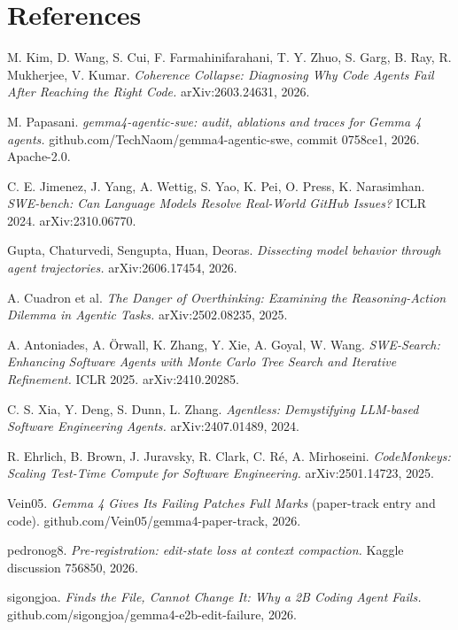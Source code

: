 \documentclass[10pt]{article}
\begin{document}
\section*{References}\small
\noindent [1] M. Kim, D. Wang, S. Cui, F. Farmahinifarahani, T. Y. Zhuo, S. Garg, B. Ray, R. Mukherjee, V. Kumar. \emph{Coherence Collapse: Diagnosing Why Code Agents Fail After Reaching the Right Code.} arXiv:2603.24631, 2026.\par\smallskip
\noindent [2] M. Papasani. \emph{gemma4-agentic-swe: audit, ablations and traces for Gemma 4 agents.} github.com/TechNaom/gemma4-agentic-swe, commit 0758ce1, 2026. Apache-2.0.\par\smallskip
\noindent [3] C. E. Jimenez, J. Yang, A. Wettig, S. Yao, K. Pei, O. Press, K. Narasimhan. \emph{SWE-bench: Can Language Models Resolve Real-World GitHub Issues?} ICLR 2024. arXiv:2310.06770.\par\smallskip
\noindent [4] Gupta, Chaturvedi, Sengupta, Huan, Deoras. \emph{Dissecting model behavior through agent trajectories.} arXiv:2606.17454, 2026.\par\smallskip
\noindent [5] A. Cuadron et al. \emph{The Danger of Overthinking: Examining the Reasoning-Action Dilemma in Agentic Tasks.} arXiv:2502.08235, 2025.\par\smallskip
\noindent [6] A. Antoniades, A. Örwall, K. Zhang, Y. Xie, A. Goyal, W. Wang. \emph{SWE-Search: Enhancing Software Agents with Monte Carlo Tree Search and Iterative Refinement.} ICLR 2025. arXiv:2410.20285.\par\smallskip
\noindent [7] C. S. Xia, Y. Deng, S. Dunn, L. Zhang. \emph{Agentless: Demystifying LLM-based Software Engineering Agents.} arXiv:2407.01489, 2024.\par\smallskip
\noindent [8] R. Ehrlich, B. Brown, J. Juravsky, R. Clark, C. Ré, A. Mirhoseini. \emph{CodeMonkeys: Scaling Test-Time Compute for Software Engineering.} arXiv:2501.14723, 2025.\par\smallskip
\noindent [9] Vein05. \emph{Gemma 4 Gives Its Failing Patches Full Marks} (paper-track entry and code). github.com/Vein05/gemma4-paper-track, 2026.\par\smallskip
\noindent [10] pedronog8. \emph{Pre-registration: edit-state loss at context compaction.} Kaggle discussion 756850, 2026.\par\smallskip
\noindent [11] sigongjoa. \emph{Finds the File, Cannot Change It: Why a 2B Coding Agent Fails.} github.com/sigongjoa/gemma4-e2b-edit-failure, 2026.\par\smallskip
\end{document}
